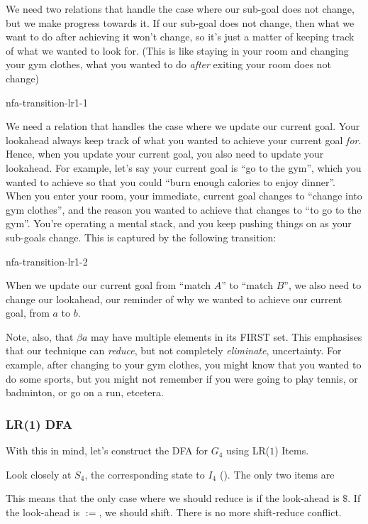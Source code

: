 We need two relations that handle the case where our sub-goal does not change, but we make progress towards it. If our sub-goal does not change, then what we want to do after achieving it won't change, so it's just a matter of keeping track of what we wanted to look for. (This is like staying in your room and changing your gym clothes, what you wanted to do \textit{after} exiting your room does not change)
\begin{center}
    {nfa-transition-lr1-1}
\end{center}

We need a relation that handles the case where we update our current goal. Your lookahead always keep track of what you wanted to achieve your current goal \textit{for}. Hence, when you update your current goal, you also need to update your lookahead. For example, let's say your current goal is ``go to the gym'', which you wanted to achieve so that you could ``burn enough calories to enjoy dinner''. When you enter your room, your immediate, current goal changes to ``change into gym clothes'', and the reason you wanted to achieve that changes to ``to go to the gym''. You're operating a mental stack, and you keep pushing things on as your sub-goals change. This is captured by the following transition:
\begin{center}
  {nfa-transition-lr1-2}
\end{center}

When we update our current goal from ``match $A$'' to ``match $B$'', we also need to change our lookahead, our reminder of why we wanted to achieve our current goal, from $a$ to $b$.

Note, also, that $\beta a$ may have multiple elements in its FIRST set. This emphasises that our technique can \textit{reduce}, but not completely \textit{eliminate}, uncertainty. For example, after changing to your gym clothes, you might know that you wanted to do some sports, but you might not remember if you were going to play tennis, or badminton, or go on a run, etcetera. 

\subsubsection{LR(1) DFA}
With this in mind, let's construct the DFA for $G_4$ using LR($1$) Items.

Look closely at $S_4$, the corresponding state to $I_4$ (). The only two items are
\begin{center}
\end{center}
This means that the only case where we should reduce is if the look-ahead is $\$$. If the look-ahead is $:=$, we should shift. There is no more shift-reduce conflict.

